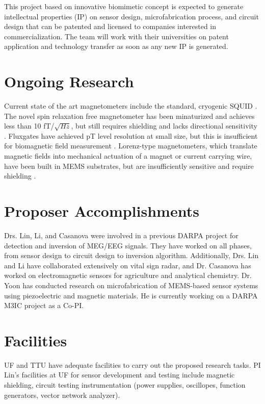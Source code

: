 This project based on innovative biomimetic concept is expected to generate intellectual properties (IP) on sensor design, microfabrication process, and circuit design that can be patented and licensed to companies interested in commercialization. The team will work with their universities on patent application and technology transfer as soon as any new IP is generated. 

\section{Ongoing Research}
Current state of the art magnetometers include the standard, cryogenic SQUID \cite{lenz2006magnetic}. The novel spin relaxation free magnetometer has been minaturized and achieves less than 10 fT/$\sqrt{Hz}$, but still requires shielding and lacks directional sensitivity \cite{shah2013compact}. Fluxgates have achieved pT level resolution at small size, but this is insufficient for biomagnetic field measurement \cite{sasada2002orthogonal,uchiyama2014highly,sasada2014fundamental}. Lorenz-type magnetometers, which translate magnetic fields into mechanical actuation of a magnet or current carrying wire, have been built in MEMS substrates, but are insufficiently sensitive and require shielding \cite{sinha201627,kyynarainen20083d,kumar2015ultra,thompson2009parametrically}.

\section{Proposer Accomplishments}
Drs. Lin, Li, and Casanova were involved in a previous DARPA project for detection and inversion of MEG/EEG signals. They have worked on all phases, from sensor design to circuit design to inversion algorithm. Additionally, Drs. Lin and Li have collaborated extensively on vital sign radar, and Dr. Casanova has worked on electromagnetic sensors for agriculture and analytical chemistry. Dr. Yoon has conducted research on microfabrication of MEMS-based sensor systems using piezoelectric and magnetic materials. He is currently working on a DARPA M3IC project as a Co-PI.

\section{Facilities}
UF and TTU have adequate facilities to carry out the proposed research tasks.
PI Lin's facilities at UF for sensor development and testing include magnetic shielding, circuit testing instrumentation (power supplies, oscillopes, function generators, vector network analyzer). 

